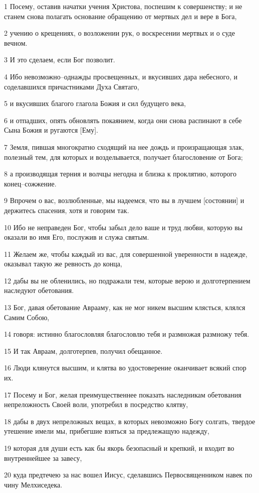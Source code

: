 \par 1 Посему, оставив начатки учения Христова, поспешим к совершенству; и не станем снова полагать основание обращению от мертвых дел и вере в Бога,
\par 2 учению о крещениях, о возложении рук, о воскресении мертвых и о суде вечном.
\par 3 И это сделаем, если Бог позволит.
\par 4 Ибо невозможно--однажды просвещенных, и вкусивших дара небесного, и соделавшихся причастниками Духа Святаго,
\par 5 и вкусивших благого глагола Божия и сил будущего века,
\par 6 и отпадших, опять обновлять покаянием, когда они снова распинают в себе Сына Божия и ругаются [Ему].
\par 7 Земля, пившая многократно сходящий на нее дождь и произращающая злак, полезный тем, для которых и возделывается, получает благословение от Бога;
\par 8 а производящая терния и волчцы негодна и близка к проклятию, которого конец--сожжение.
\par 9 Впрочем о вас, возлюбленные, мы надеемся, что вы в лучшем [состоянии] и держитесь спасения, хотя и говорим так.
\par 10 Ибо не неправеден Бог, чтобы забыл дело ваше и труд любви, которую вы оказали во имя Его, послужив и служа святым.
\par 11 Желаем же, чтобы каждый из вас, для совершенной уверенности в надежде, оказывал такую же ревность до конца,
\par 12 дабы вы не обленились, но подражали тем, которые верою и долготерпением наследуют обетования.
\par 13 Бог, давая обетование Аврааму, как не мог никем высшим клясться, клялся Самим Собою,
\par 14 говоря: истинно благословляя благословлю тебя и размножая размножу тебя.
\par 15 И так Авраам, долготерпев, получил обещанное.
\par 16 Люди клянутся высшим, и клятва во удостоверение оканчивает всякий спор их.
\par 17 Посему и Бог, желая преимущественнее показать наследникам обетования непреложность Своей воли, употребил в посредство клятву,
\par 18 дабы в двух непреложных вещах, в которых невозможно Богу солгать, твердое утешение имели мы, прибегшие взяться за предлежащую надежду,
\par 19 которая для души есть как бы якорь безопасный и крепкий, и входит во внутреннейшее за завесу,
\par 20 куда предтечею за нас вошел Иисус, сделавшись Первосвященником навек по чину Мелхиседека.

